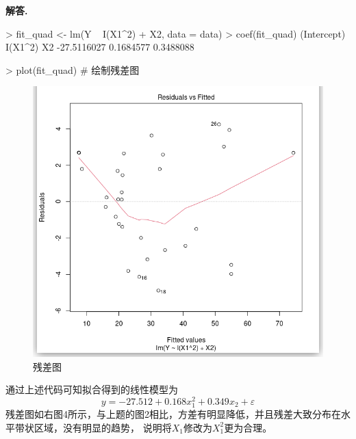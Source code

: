 \documentclass[12pt, a4paper, oneside]{ctexart}
\newenvironment{solution}[1][]{\par\noindent\textbf{#1解答. }}{\smallskip\par}  %
\begin{document}
\begin{solution}
    \begin{rcode}
> fit_quad <- lm(Y ~ I(X1^2) + X2, data = data)
> coef(fit_quad)
(Intercept)     I(X1^2)          X2 
-27.5116027   0.1684577   0.3488088

> plot(fit_quad)  # 绘制残差图
    \end{rcode}

\begin{figure} %
    \vspace{-0.5cm}
    \centering
    \includegraphics[scale=0.3]{./figures/2.7残差图.png}
    \caption{残差图}
\end{figure}
    通过上述代码可知拟合得到的线性模型为
    \begin{equation*}
        y = -27.512 + 0.168x_1^2 + 0.349x_2+\varepsilon
    \end{equation*}
    残差图如右图4所示，与上题的图2相比，方差有明显降低，并且残差大致分布在水平带状区域，没有明显的趋势，
    说明将$X_1$修改为$X_1^2$更为合理。
    
    \ 

    \ 

    \ 
\end{solution}
\end{document}
